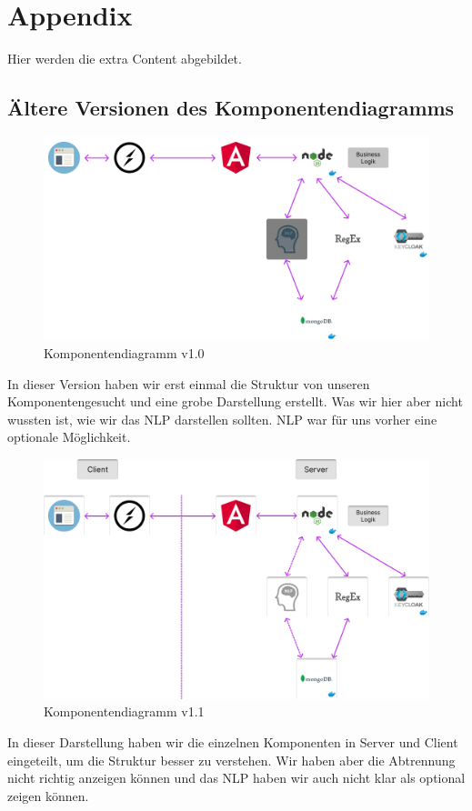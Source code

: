 \section{Appendix}
Hier werden die extra Content abgebildet.

\subsection{Ältere Versionen des Komponentendiagramms}


\begin{figure}[!hbt]
    \centering
    \includegraphics[width=1.0\textwidth]{bilder/technologien/Komponenten-Diagram-v1.png}
    \caption{Komponentendiagramm v1.0}
    \label{fig:Komponentendiagramm_v1.0}
    \end{figure}

\noindent In dieser Version haben wir erst einmal die Struktur von unseren Komponentengesucht und eine
grobe Darstellung erstellt. Was wir hier aber nicht wussten ist, wie wir das NLP darstellen sollten.
NLP war für uns vorher eine optionale Möglichkeit.

    \begin{figure}[!hbt]
        \centering
        \includegraphics[width=1.0\textwidth]{bilder/technologien/Komponentendiagram v1.1.png}
        \caption{Komponentendiagramm v1.1}
        \label{fig:Komponentendiagramm_v1.1}
        \end{figure}
        \FloatBarrier %

\noindent In dieser Darstellung haben wir die einzelnen Komponenten in Server und Client 
eingeteilt, um die Struktur besser zu verstehen. Wir haben aber die Abtrennung nicht richtig anzeigen können
und das NLP haben wir auch nicht klar als optional zeigen können.
        